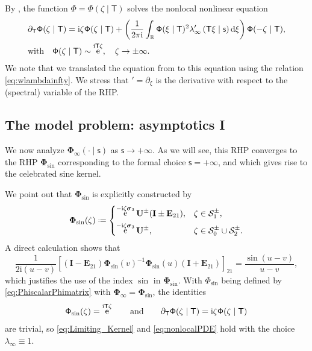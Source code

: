 \documentclass[reqno,a4paper,11pt]{amsart}
\DeclareMathOperator{\ee}{\rm e}
\newcommand{\R}{\mathbb{R}}
\newcommand{\ii}{\mathrm{i}}
\newcommand{\dd}{\mathrm{d}}
\newcommand*{\deff}{\mathrel{\vcenter{\baselineskip0.5ex \lineskiplimit0pt
                     \hbox{\scriptsize.}\hbox{\scriptsize.}}}%
                     =}
\renewcommand{\bm}{\mathbf}
\newcommand{\mcal}{\mathcal}
\newcommand{\msf}{\mathsf}
\renewcommand{\sp}{\boldsymbol \sigma}
\newcommand{\Tad}{\msf T}
\newcommand{\sad}{\msf s}
\theoremstyle{definition}
\theoremstyle{remark}
\numberwithin{equation}{section}
\begin{document}
By \cite[Theorem 2.1 and Corollary 5.2]{ClaeysTarricone24}, the function $\msf \Phi=\msf \Phi(\zeta \mid \msf T)$ solves the nonlocal nonlinear equation
%
\begin{equation}\label{eq:nonlocalPDE}
\begin{aligned}
    & \partial_{\msf T} \msf \Phi(\zeta \mid \msf T) =\ii \zeta\msf\Phi(\zeta \mid \msf T ) + \left(\frac{1}{2\pi\ii }\int_\R \msf \Phi(\xi \mid \msf T)^2 \lambda_\infty' \left(\Tad \xi \mid \sad \right)\dd\xi\right)\msf \Phi(-\zeta \mid \msf T), \\
    & \text{with}\quad \msf \Phi(\zeta \mid \Tad) \sim \ee^{\ii \Tad \zeta}, \quad \zeta \to \pm \infty.
\end{aligned}
\end{equation}
%
We note that we translated the equation from \cite{ClaeysTarricone24} to this equation using the relation \eqref{eq:wlambdainfty}. We stress that $'=\partial_\xi$ is the derivative with respect to the (spectral) variable of the RHP.

\subsection{The model problem: asymptotics I}\label{sec:Asymptotics1}\hfill 

We now analyze $\bm \Phi_\infty(\cdot\mid \sad)$ as $\sad\to +\infty$. As we will see, this RHP converges to the RHP ${\bm \Phi}_{\sin}$ corresponding to the formal choice $\sad =+\infty$, and which gives rise to the celebrated sine kernel.

We point out that $\bm \Phi_{\sin}$ is explicitly constructed by
%
$$
\bm \Phi_{\sin}(\zeta)\deff 
\begin{dcases}
    \ee^{-\ii\zeta\sp_3}\bm U^\pm (\bm I\pm\bm E_{21}), & \zeta\in \mcal S^\pm_1, \\ 
    \ee^{-\ii\zeta\sp_3}\bm U^\pm , & \zeta\in \mcal S^\pm_0\cup \mcal S^\pm_2. 
\end{dcases}
$$
%
A direct calculation shows that
%
\begin{equation}\label{eq:SinekernelRHPcharac}
\frac{1}{2\ii(u-v)}\left[ \left( \bm I-\bm E_{21} \right)\bm \Phi_{\sin}(v)^{-1} {\bm \Phi}_{\sin}(u)\left(\bm I+\bm E_{21}\right) \right]_{21}=\frac{\sin(u-v)}{u-v},
\end{equation}
%
which justifies the use of the index $\sin$ in ${\bm\Phi}_{\sin}$. With $\msf \Phi_{\sin}$ being defined by \eqref{eq:PhiscalarPhimatrix} with $\bm \Phi_\infty=\bm\Phi_{\sin}$, the identities 
\[
    \msf \Phi_{\sin}(\zeta) = \ee^{\ii \msf T \zeta}\qquad \text{and}\qquad   \partial_{\msf T} \msf \Phi(\zeta \mid \msf T)=\ii \zeta\msf\Phi(\zeta \mid \msf T)
\]
%
are trivial, so \eqref{eq:Limiting_Kernel} and \eqref{eq:nonlocalPDE} hold with the choice $\lambda_\infty \equiv 1$.
\end{document}
